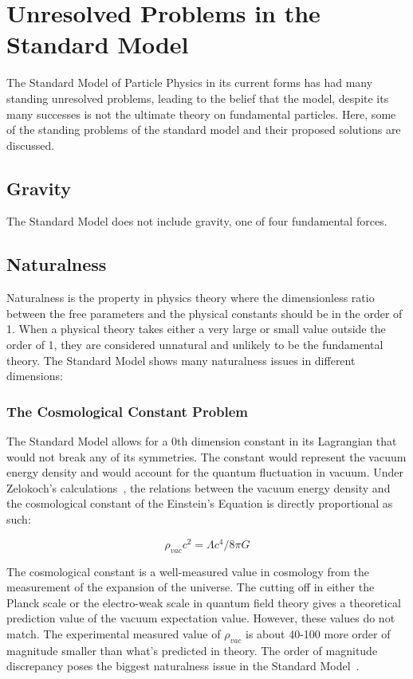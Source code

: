 \section{Unresolved Problems in the Standard Model}
The Standard Model of Particle Physics in its current forms has had many standing unresolved problems, leading to the belief that the model, despite its many successes is not the ultimate theory on fundamental particles. Here, some of the standing problems of the standard model and their proposed solutions are discussed.

\subsection{Gravity}
The Standard Model does not include gravity, one of four fundamental forces.     

\subsection{Naturalness}
Naturalness is the property in physics theory where the dimensionless ratio between the free parameters and the physical constants should be in the order of 1. When a physical theory takes either a very large or small value outside the order of 1, they are considered unnatural and unlikely to be the fundamental theory. 
The Standard Model shows many naturalness issues in different dimensions: 

\subsubsection{The Cosmological Constant Problem}
The Standard Model allows for a 0th dimension constant in its Lagrangian that would not break any of its symmetries. The constant would represent the vacuum energy density and would account for the quantum fluctuation in vacuum. Under Zelokoch's calculations~\cite{zel1968cosmological}, the relations between the vacuum energy density and the cosmological constant of the Einstein's Equation is directly proportional as such:

\begin{equation}
    \rho_{vac}c^2=\Lambda c^4/8\pi G
\label{eq:cosmoconst}
\end{equation}

The cosmological constant is a well-measured value in cosmology from the measurement of the expansion of the universe. The cutting off in either the Planck scale or the electro-weak scale in quantum field theory gives a theoretical prediction value of the vacuum expectation value. However, these values do not match. The experimental measured value of $\rho_{vac}$ is about 40-100 more order of magnitude smaller than what's predicted in theory. The order of magnitude discrepancy poses the
biggest naturalness issue in the Standard Model~\cite{V2002}.

